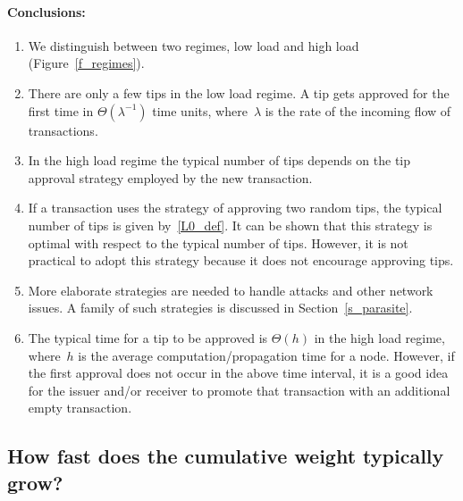 \documentclass[12pt]{article}
\begin{document}
\begin{CJK}{UTF8}{bkai}
\paragraph{Conclusions:}
\begin{enumerate}
 \item We distinguish between two regimes, low load and high
load (Figure~\ref{f_regimes}).
 \item There are only a few tips in the low load regime.
 A
 tip gets approved for the first
time in $\Theta(\lambda^{-1})$ time units, where~$\lambda$ is the rate of the 
incoming flow of transactions.
 \item In the high load regime the typical number 
of tips depends on the tip approval strategy employed by the new 
transaction. 
 \item If a transaction uses the strategy of approving two 
 random tips, the typical number of tips is given by~\eqref{L0_def}. 
 It can be shown 
that this strategy is optimal with respect to the typical
number of tips. However, it is not practical to adopt this strategy
because it does not encourage approving tips.
 \item More elaborate strategies are needed to handle attacks 
 and other network issues. A family 
of such strategies 
is discussed in Section~\ref{s_parasite}.
 \item The typical time for a 
tip to be approved is $\Theta(h)$ in the high load regime, where~$h$ 
is the average computation/propagation time for a node. However, 
if the first approval does not occur in the above time interval,
it is a good idea for the issuer and/or receiver
to promote that transaction with an additional empty transaction.
\end{enumerate}




\subsection{How fast does the cumulative weight typically grow?}
\label{s_cum_grow}


\end{CJK}
\end{document}
